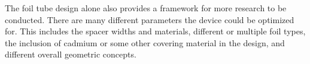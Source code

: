 The foil tube design alone also provides a framework for more research to be conducted.
There are many different parameters the device could be optimized for.
This includes the spacer widths and materials, different or multiple foil types, the inclusion of cadmium or some other covering material in the design, and different overall geometric concepts.



